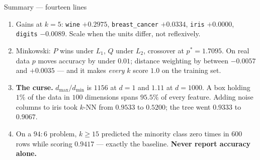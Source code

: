\documentclass[aspectratio=169]{beamer}
\begin{document}
\begin{frame}[shrink=16]{Summary --- fourteen lines}
\begin{enumerate}
      patients and the class of $19$.
    \item Gains at $k=5$: \texttt{wine} $+0.2975$, \texttt{breast\_cancer}
      $+0.0334$, \texttt{iris} $+0.0000$, \texttt{digits}
      $\mathbf{-0.0089}$. Scale when the units differ, not reflexively.
    \item Minkowski: $P$ wins under $L_1$, $Q$ under $L_2$, crossover at
      $p^\ast = 1.7095$. On real data $p$ moves accuracy by under $0.01$;
      distance weighting by between $-0.0057$ and $+0.0035$ --- and it makes
      \emph{every} $k$ score $1.0$ on the training set.
    \item \textbf{The curse.} $d_{\max}/d_{\min}$ is $1156$ at $d=1$ and
      $1.11$ at $d=1000$. A box holding $1\%$ of the data in $100$ dimensions
      spans $95.5\%$ of every feature. Adding noise columns to iris took
      $k$-NN from $0.9533$ to $0.5200$; the tree went $0.9333$ to $0.9067$.
    \item On a $94{:}6$ problem, $k \ge 15$ predicted the minority class zero
      times in $600$ rows while scoring $0.9417$ --- exactly the baseline.
      \textbf{Never report accuracy alone.}
  \end{enumerate}
\end{frame}
\end{document}
